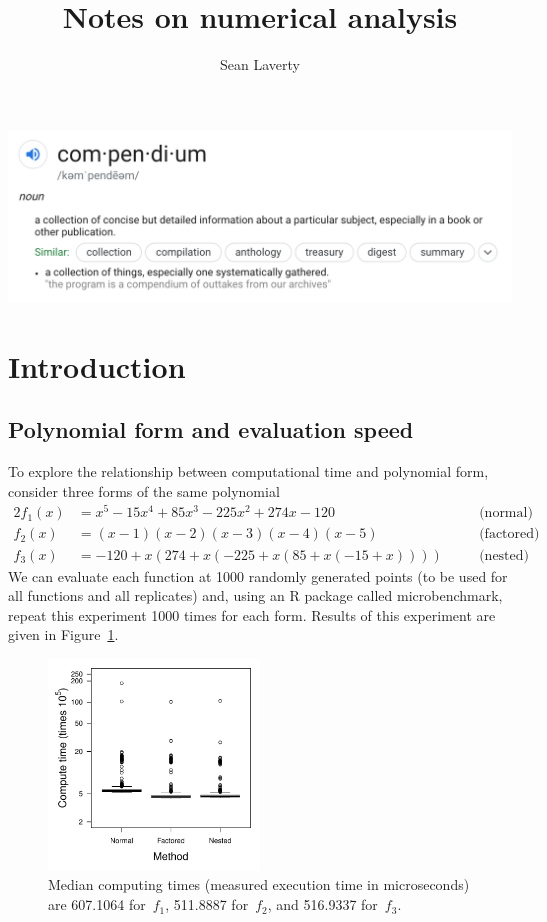 \documentclass[11pt]{article}
\title{Notes on numerical analysis}
\author{Sean Laverty}
\begin{document}
\maketitle
\thispagestyle{empty}
\newpage

\includegraphics[width=\textwidth]{compendium.png}
\newpage

\pagestyle{fancy}
\tableofcontents
\clearpage

\section{Introduction}
\subsection{Polynomial form and evaluation speed}
To explore the relationship between computational time and polynomial form, consider three forms of the same polynomial
\begin{alignat*}{2}
f_1(x) & = x^5 - 15x^4 + 85x^3 - 225x^2 + 274x -120 && \quad\text{(normal)}\\
%
f_2(x) & = (x - 1)(x - 2)(x - 3)(x - 4)(x - 5) && \quad\text{(factored)}\\
%
f_3(x) & = -120 + x(274 + x(-225 + x(85 + x(-15 + x)))) && \quad\text{(nested)}
\end{alignat*}
%
We can evaluate each function at 1000 randomly generated points (to be used for all functions and all replicates) and, using an \textsf{R} package called \textsf{microbenchmark}, repeat this experiment 1000 times for each form. Results of this experiment are given in Figure~\ref{fig::polys}.
%
\begin{figure}[ht!]\centering
\includegraphics[width=0.5\textwidth]{1_basics/polynomial_evaluation_plot.pdf}
\caption{Median computing times (measured execution time in microseconds) are 607.1064 for~\(f_1\), 511.8887 for~\(f_2\), and 516.9337 for~\(f_3\).}\label{fig::polys}
\end{figure}
\end{document}
